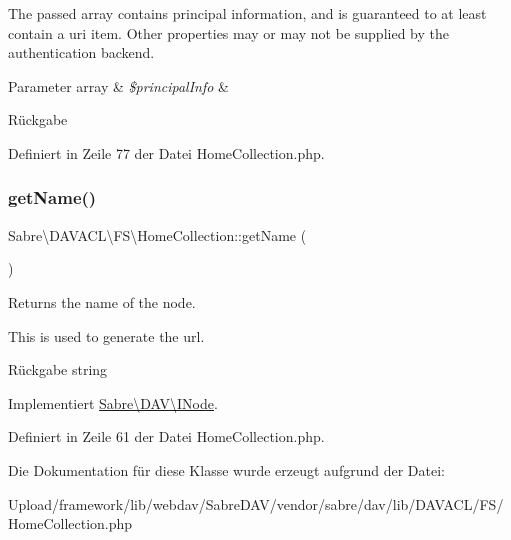 The passed array contains principal information, and is guaranteed to at least contain a uri item. Other properties may or may not be supplied by the authentication backend.


\begin{DoxyParams}[1]{Parameter}
array & {\em \$principal\+Info} & \\
\hline
\end{DoxyParams}
\begin{DoxyReturn}{Rückgabe}

\end{DoxyReturn}


Definiert in Zeile 77 der Datei Home\+Collection.\+php.

\mbox{\label{class_sabre_1_1_d_a_v_a_c_l_1_1_f_s_1_1_home_collection_aeecd8557ff4548558c0cbe1e2aca45bf}} 
\subsubsection{\texorpdfstring{get\+Name()}{getName()}}
{\footnotesize\ttfamily Sabre\textbackslash{}\+D\+A\+V\+A\+C\+L\textbackslash{}\+F\+S\textbackslash{}\+Home\+Collection\+::get\+Name (\begin{DoxyParamCaption}{ }\end{DoxyParamCaption})}

Returns the name of the node.

This is used to generate the url.

\begin{DoxyReturn}{Rückgabe}
string 
\end{DoxyReturn}


Implementiert \mbox{\hyperlink{interface_sabre_1_1_d_a_v_1_1_i_node_ab616fe836b1ae36af12126a2bc934dce}{Sabre\textbackslash{}\+D\+A\+V\textbackslash{}\+I\+Node}}.



Definiert in Zeile 61 der Datei Home\+Collection.\+php.



Die Dokumentation für diese Klasse wurde erzeugt aufgrund der Datei\+:\begin{DoxyCompactItemize}
\item 
Upload/framework/lib/webdav/\+Sabre\+D\+A\+V/vendor/sabre/dav/lib/\+D\+A\+V\+A\+C\+L/\+F\+S/Home\+Collection.\+php\end{DoxyCompactItemize}

